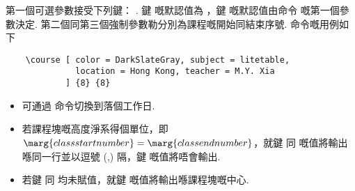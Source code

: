 \documentclass[letterpaper]{l3doc}
\begin{document}
第一個可選參數接受下列鍵：    . 鍵  嘅默認值為 ，鍵  嘅默認值由命令  嘅第一個參數決定. 第二個同第三個強制參數勒分別為課程嘅開始同結束序號.  命令嘅用例如下

\begin{Verbatim}
    \course [ color = DarkSlateGray, subject = litetable,
              location = Hong Kong, teacher = M.Y. Xia
            ] {8} {8}
\end{Verbatim}

\begin{center}
    \noindent{}
\end{center}

\begin{itemize}
    \item 可通過  命令切換到落個工作日.
    \item 若課程塊嘅高度淨系得個單位，即$\marg{class start number} = \marg{class end number}$，就鍵  同  嘅值將輸出喺同一行並以逗號 (,) 隔，鍵  嘅值將唔會輸出.
    \item 若鍵  同  均未賦值，就鍵  嘅值將輸出喺課程塊嘅中心.
\end{itemize}


\end{document}
